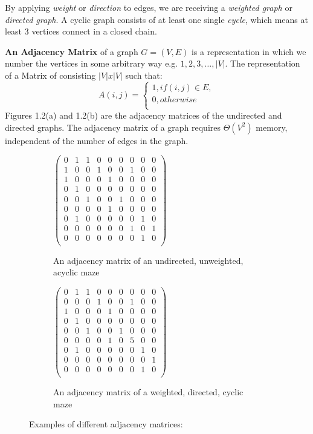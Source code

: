 By applying \textit{weight} or \textit{direction} to edges, we are receiving a \textit{ weighted graph} or \textit{directed graph}. A cyclic graph consists of at least one single \textit{cycle}, which means at least 3 vertices connect in a closed chain. 
\newline
\begin{definition} \textbf{An Adjacency Matrix } of a graph $G=(V, E)$ is a representation in which we number the vertices in some arbitrary way e.g. $1,2,3,\dots, |V|$. The representation of a Matrix of
consisting $|V|x|V|$ such that: 
$$A(i,j)=
\begin{cases}
1, if (i,j)\in E,\\
0, otherwise\\
\end{cases}$$
Figures 1.2(a) and 1.2(b) are the adjacency matrices of the undirected and directed graphs.
The adjacency matrix of a graph requires $\varTheta(V^2)$ memory, independent of the number of edges in the graph.
\end{definition}
\begin{figure}[!h]
	\centering
	\begin{subfigure}{.35\textwidth}
	  \centering
	  $\begin{pmatrix}
		0&1&1&0&0&0&0&0&0\\
		1&0&0&1&0&0&1&0&0\\
		1&0&0&0&1&0&0&0&0\\
		0&1&0&0&0&0&0&0&0\\
		0&0&1&0&0&1&0&0&0\\
		0&0&0&0&1&0&0&0&0\\
		0&1&0&0&0&0&0&1&0\\
		0&0&0&0&0&0&1&0&1\\
		0&0&0&0&0&0&0&1&0\\
	\end{pmatrix}$
	  \caption{An adjacency matrix of an undirected, unweighted, acyclic maze}
	  \label{fig:sub1}
	\end{subfigure}
	\begin{subfigure}{.35\textwidth}
	  \centering
	  $\begin{pmatrix}
		0&1&1&0&0&0&0&0&0\\
		0&0&0&1&0&0&1&0&0\\
		1&0&0&0&1&0&0&0&0\\
		0&1&0&0&0&0&0&0&0\\
		0&0&1&0&0&1&0&0&0\\
		0&0&0&0&1&0&5&0&0\\
		0&1&0&0&0&0&0&1&0\\
		0&0&0&0&0&0&0&0&1\\
		0&0&0&0&0&0&0&1&0\\
	\end{pmatrix}$
	  \caption{An adjacency matrix of a weighted, directed, cyclic maze}
	  \label{fig:sub2}
	\end{subfigure}
	\caption{Examples of different adjacency matrices:}
	\label{fig:test}
\end{figure}

